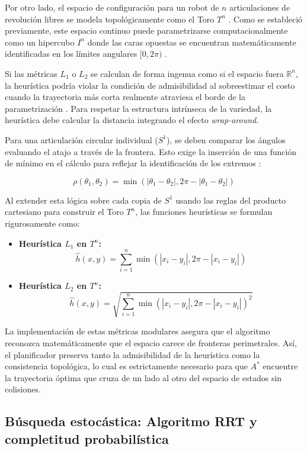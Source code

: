 Por otro lado, el espacio de configuración para un robot de $n$ articulaciones de revolución libres se 
modela topológicamente como el Toro $T^n$ \parencite{farber2008}. Como se estableció previamente, 
este espacio continuo puede parametrizarse computacionalmente como un hipercubo $I^n$ donde las caras 
opuestas se encuentran matemáticamente identificadas en los límites angulares $[0, 2\pi)$ \parencite{lavalle2006planning}.

Si las métricas $L_1$ o $L_2$ se calculan de forma ingenua como si el 
espacio fuera $\mathbb{R}^n$, la heurística podría violar la condición de admisibilidad al 
sobreestimar el costo cuando la trayectoria más corta realmente atraviesa el borde de 
la parametrización \parencite{lavalle2006planning}. Para respetar la estructura intrínseca de la variedad, 
la heurística debe calcular la distancia integrando el efecto \textit{wrap-around}. 

Para una articulación circular individual ($S^1$), se deben comparar los ángulos evaluando 
el atajo a través de la frontera. Esto exige la inserción de una función de mínimo en el
cálculo para reflejar la identificación de los extremos \parencite{lavalle2006planning}:

$$ \rho(\theta_1, \theta_2) = \min(|\theta_1 - \theta_2|, 2\pi - |\theta_1 - \theta_2|) $$

Al extender esta lógica sobre cada copia de $S^1$ usando las reglas del producto cartesiano 
para construir el Toro $T^n$, las funciones heurísticas se formulan rigurosamente como:

\begin{itemize}
\item \textbf{Heurística $L_1$ en $T^n$:} 
$$\hat{h}(x, y) = \sum_{i=1}^n \min(|x_i - y_i|, 2\pi - |x_i - y_i|)$$
\item \textbf{Heurística $L_2$ en $T^n$:} 
$$\hat{h}(x, y) = \sqrt{\sum_{i=1}^n \min(|x_i - y_i|, 2\pi - |x_i - y_i|)^2}$$
\end{itemize}

La implementación de estas métricas modulares asegura que el algoritmo reconozca 
matemáticamente que el espacio carece de fronteras perimetrales. Así, el planificador 
preserva tanto la admisibilidad de la heurística como la consistencia topológica, lo cual es estrictamente 
necesario para que $A^*$ encuentre la trayectoria óptima que cruza de un lado al otro del espacio 
de estados sin colisiones.


\subsection{Búsqueda estocástica: Algoritmo RRT y completitud probabilística}

